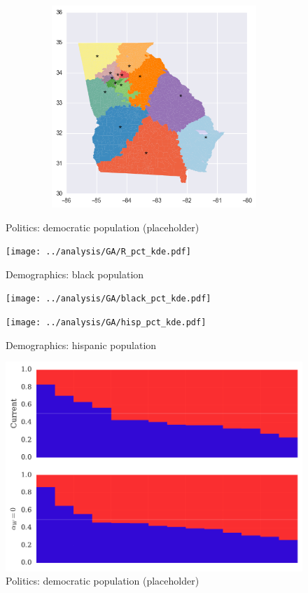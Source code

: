 \begin{figure}[htb!]
\includegraphics[width=5in,height=3in,keepaspectratio]{../maps/GA/static/0_25_after.png}
\end{figure}

\clearpage
\newpage

\begin{figure}[htb!] \centering
\caption{ Politics: democratic population (placeholder)}
\texttt{[image: ../analysis/GA/R\_pct\_kde.pdf]}
\caption{ Demographics: black population }
\texttt{[image: ../analysis/GA/black\_pct\_kde.pdf]}
\caption{ Demographics: hispanic population }
\texttt{[image: ../analysis/GA/hisp\_pct\_kde.pdf]}
\end{figure}

\clearpage
\newpage

\begin{figure}[htb!] \centering
\caption{ Politics: democratic population (placeholder)}
\includegraphics[width=6in]{../analysis/GA/barplot.pdf}
\end{figure}

